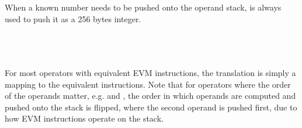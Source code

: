 When a known number needs to be pushed onto the operand stack,  is always used to push it as a 256 bytes integer. \\\\
\begin{prooftree}
\end{prooftree}\\\\
For most operators with equivalent EVM instructions, the translation is simply a mapping to the equivalent instructions. Note that for operators where the order of the operands matter, e.g. \code{-} and \code{<}, the order in which operands are computed and pushed onto the stack is flipped, where the second operand is pushed first, due to how EVM instructions operate on the stack. \\\\
\begin{prooftree}
\end{prooftree}\qquad
\begin{prooftree}
\end{prooftree}\qquad
\begin{prooftree}
\end{prooftree}\\\\\\
\begin{prooftree}
\end{prooftree}\qquad
\begin{prooftree}
\end{prooftree}\qquad
\begin{prooftree}
\end{prooftree} \\\\\\
